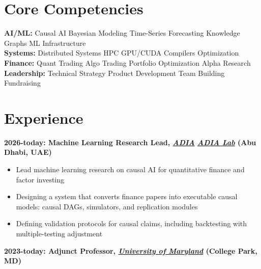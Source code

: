 \documentclass[10pt, letterpaper]{article}
\providecommand{\tightlist}{%
\setlength{\itemsep}{0pt}
\setlength{\parskip}{0pt}}
\begin{document}
  \section{\texorpdfstring{\textbf{Core Competencies}}{Core Competencies}}
  \label{core-competencies}

  \textbf{AI/ML:} Causal AI \textbar{} Bayesian Modeling \textbar{} Time-Series
  Forecasting \textbar{} Knowledge Graphs \textbar{} ML Infrastructure \\
  \textbf{Systems:} Distributed Systems \textbar{} HPC \textbar{} GPU/CUDA
  \textbar{} Compilers \textbar{} Optimization \\ \textbf{Finance:} Quant
  Trading \textbar{} Algo Trading \textbar{} Portfolio Optimization \textbar{}
  Alpha Research \\ \textbf{Leadership:} Technical Strategy \textbar{}
  Product Development \textbar{} Team Building \textbar{} Fundraising

  \section{\texorpdfstring{\textbf{Experience}}{Experience}}
  \label{experience}

  \textbf{2026-today: Machine Learning Research Lead,
  \href{https://www.adia.ae/}{\emph{ADIA}}
  \href{https://www.adialab.ae/}{\emph{ADIA Lab}} (Abu Dhabi, UAE)}

  \begin{itemize}
    \tightlist

    \item Lead machine learning research on causal AI for quantitative
      finance and factor investing

    \item Designing a system that converts finance papers into executable
      causal models: causal DAGs, simulators, and replication modules

    \item Defining validation protocols for causal claims, including
      backtesting with multiple-testing adjustment
  \end{itemize}

  \textbf{2023-today: Adjunct Professor,
  \href{https://cmns.umd.edu/people/giacinto-paolo-saggese}{\emph{University
  of Maryland}}
  (College Park, MD)}
\end{document}
